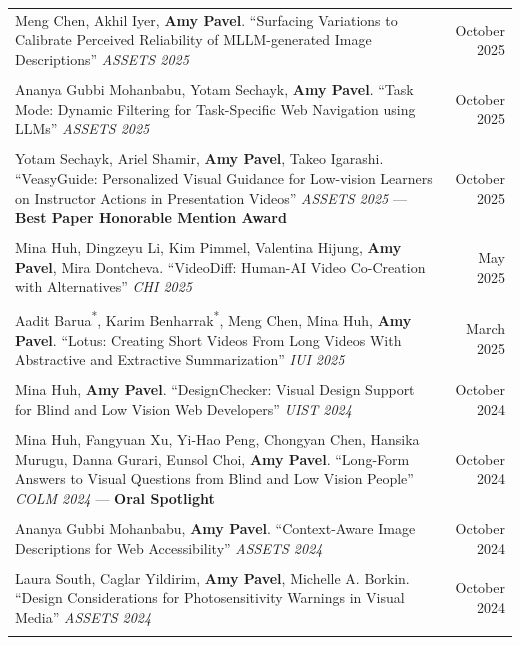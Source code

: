 \begin{longtable}{Xr}
	Meng Chen, Akhil Iyer, \textbf{Amy Pavel}. ``Surfacing Variations to Calibrate Perceived Reliability of MLLM-generated Image Descriptions'' \textit{ASSETS 2025} & October 2025 \\
	\\

	Ananya Gubbi Mohanbabu, Yotam Sechayk, \textbf{Amy Pavel}. ``Task Mode: Dynamic Filtering for Task-Specific Web Navigation using LLMs'' \textit{ASSETS 2025} & October 2025 \\
	\\

	Yotam Sechayk, Ariel Shamir, \textbf{Amy Pavel}, Takeo Igarashi. ``VeasyGuide: Personalized Visual Guidance for Low-vision Learners on Instructor Actions in Presentation Videos'' \textit{ASSETS 2025} --- \textbf{Best Paper Honorable Mention Award} & October 2025 \\
	\\

	Mina Huh, Dingzeyu Li, Kim Pimmel, Valentina Hijung, \textbf{Amy Pavel}, Mira Dontcheva. ``VideoDiff: Human-AI Video Co-Creation with Alternatives'' \textit{CHI 2025} & May 2025 \\
	\\

	Aadit Barua\textsuperscript{*}, Karim Benharrak\textsuperscript{*}, Meng Chen, Mina Huh, \textbf{Amy Pavel}. ``Lotus: Creating Short Videos From Long Videos With Abstractive and Extractive Summarization'' \textit{IUI 2025} & March 2025 \\
	\\

	Mina Huh, \textbf{Amy Pavel}. ``DesignChecker: Visual Design Support for Blind and Low Vision Web Developers'' \textit{UIST 2024} & October 2024 \\
	\\

	Mina Huh, Fangyuan Xu, Yi-Hao Peng, Chongyan Chen, Hansika Murugu, Danna Gurari, Eunsol Choi, \textbf{Amy Pavel}. ``Long-Form Answers to Visual Questions from Blind and Low Vision People'' \textit{COLM 2024} --- \textbf{Oral Spotlight} & October 2024 \\
	\\

	Ananya Gubbi Mohanbabu, \textbf{Amy Pavel}. ``Context-Aware Image Descriptions for Web Accessibility'' \textit{ASSETS 2024} & October 2024 \\
	\\

	Laura South, Caglar Yildirim, \textbf{Amy Pavel}, Michelle A. Borkin. ``Design Considerations for Photosensitivity Warnings in Visual Media'' \textit{ASSETS 2024} & October 2024 \\
	\\


\end{longtable}
